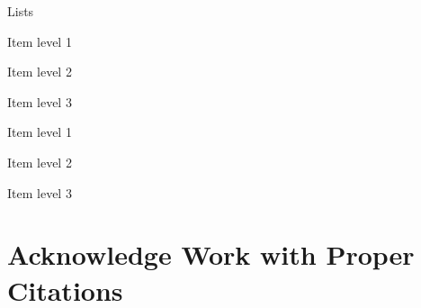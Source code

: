 \documentclass[aspectratio=169]{beamer}
\begin{document}
\begin{frame}{Lists}
\begin{minipage}[t]{0.49\textwidth}
    \end{minipage}
    \hfill
    \begin{minipage}[t]{0.49\textwidth}
        \begin{coloredblock}
            \vspace{0.5cm}
            \begin{tugromanenumerate}
                \item Item level 1
                \begin{tugromanenumerate}
                    \item Item level 2
                    \begin{tugromanenumerate}
                        \item Item level 3
                    \end{tugromanenumerate}
                \end{tugromanenumerate}
            \end{tugromanenumerate}
        \end{coloredblock}

        \begin{coloredblock}
                \begin{boxromanenumerate}
                    \item Item level 1
                    \begin{boxromanenumerate}
                        \item Item level 2
                        \begin{boxromanenumerate}
                            \item Item level 3
                        \end{boxromanenumerate}
                    \end{boxromanenumerate}
                \end{boxromanenumerate}
        \end{coloredblock}
    \end{minipage}
\end{frame}


\section{\textbf{Acknowledge} Work with Proper \textbf{Citations}}
\end{document}
